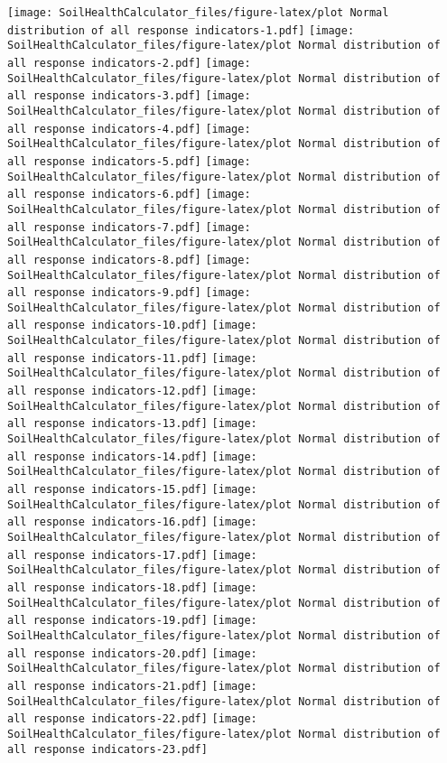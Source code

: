 \documentclass[]{article}
\begin{document}
\texttt{[image: SoilHealthCalculator\_files/figure-latex/plot Normal distribution of all response indicators-1.pdf]}
\texttt{[image: SoilHealthCalculator\_files/figure-latex/plot Normal distribution of all response indicators-2.pdf]}
\texttt{[image: SoilHealthCalculator\_files/figure-latex/plot Normal distribution of all response indicators-3.pdf]}
\texttt{[image: SoilHealthCalculator\_files/figure-latex/plot Normal distribution of all response indicators-4.pdf]}
\texttt{[image: SoilHealthCalculator\_files/figure-latex/plot Normal distribution of all response indicators-5.pdf]}
\texttt{[image: SoilHealthCalculator\_files/figure-latex/plot Normal distribution of all response indicators-6.pdf]}
\texttt{[image: SoilHealthCalculator\_files/figure-latex/plot Normal distribution of all response indicators-7.pdf]}
\texttt{[image: SoilHealthCalculator\_files/figure-latex/plot Normal distribution of all response indicators-8.pdf]}
\texttt{[image: SoilHealthCalculator\_files/figure-latex/plot Normal distribution of all response indicators-9.pdf]}
\texttt{[image: SoilHealthCalculator\_files/figure-latex/plot Normal distribution of all response indicators-10.pdf]}
\texttt{[image: SoilHealthCalculator\_files/figure-latex/plot Normal distribution of all response indicators-11.pdf]}
\texttt{[image: SoilHealthCalculator\_files/figure-latex/plot Normal distribution of all response indicators-12.pdf]}
\texttt{[image: SoilHealthCalculator\_files/figure-latex/plot Normal distribution of all response indicators-13.pdf]}
\texttt{[image: SoilHealthCalculator\_files/figure-latex/plot Normal distribution of all response indicators-14.pdf]}
\texttt{[image: SoilHealthCalculator\_files/figure-latex/plot Normal distribution of all response indicators-15.pdf]}
\texttt{[image: SoilHealthCalculator\_files/figure-latex/plot Normal distribution of all response indicators-16.pdf]}
\texttt{[image: SoilHealthCalculator\_files/figure-latex/plot Normal distribution of all response indicators-17.pdf]}
\texttt{[image: SoilHealthCalculator\_files/figure-latex/plot Normal distribution of all response indicators-18.pdf]}
\texttt{[image: SoilHealthCalculator\_files/figure-latex/plot Normal distribution of all response indicators-19.pdf]}
\texttt{[image: SoilHealthCalculator\_files/figure-latex/plot Normal distribution of all response indicators-20.pdf]}
\texttt{[image: SoilHealthCalculator\_files/figure-latex/plot Normal distribution of all response indicators-21.pdf]}
\texttt{[image: SoilHealthCalculator\_files/figure-latex/plot Normal distribution of all response indicators-22.pdf]}
\texttt{[image: SoilHealthCalculator\_files/figure-latex/plot Normal distribution of all response indicators-23.pdf]}
\end{document}
